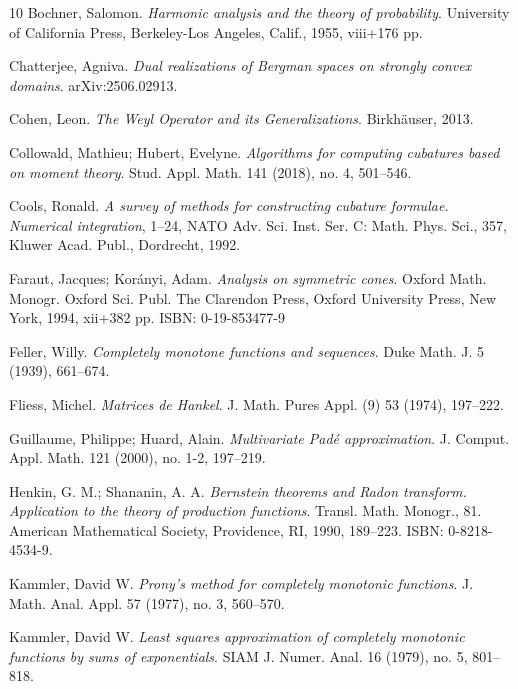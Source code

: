 \documentclass[11pt,reqno]{amsart}
\theoremstyle{plain}
\theoremstyle{definition}
\numberwithin{equation}{section}
\begin{document}
\begin{thebibliography}{10}
		 Bochner, Salomon. {\em Harmonic analysis and the theory of probability}. University of California Press, Berkeley-Los Angeles, Calif., 1955, viii+176 pp.
		
		
	


        Chatterjee, Agniva. {\em Dual realizations of Bergman spaces on strongly convex domains}. arXiv:2506.02913.

           Cohen, Leon. {\em The Weyl Operator and its Generalizations}. Birkh\"auser, 2013.

         Collowald, Mathieu; Hubert, Evelyne. {\em Algorithms for computing cubatures based on moment theory}. Stud. Appl. Math. 141 (2018), no. 4, 501–546.


 Cools, Ronald. {\em A survey of methods for constructing cubature formulae. Numerical integration}, 1--24, NATO Adv. Sci. Inst. Ser. C: Math. Phys. Sci., 357, Kluwer Acad. Publ., Dordrecht, 1992.



          Faraut, Jacques; Korányi, Adam. {\em Analysis on symmetric cones}. Oxford Math. Monogr. Oxford Sci. Publ.
The Clarendon Press, Oxford University Press, New York, 1994, xii+382 pp.
ISBN: 0-19-853477-9
		
		 Feller, Willy. {\em Completely monotone functions and sequences}.
		Duke Math. J. 5 (1939), 661–674.
		
		 Fliess, Michel. {\em Matrices de Hankel}.
		J. Math. Pures Appl. (9) 53 (1974), 197–222.
		
		
		Guillaume, Philippe; Huard, Alain. {\em Multivariate Padé approximation}.
		J. Comput. Appl. Math. 121 (2000), no. 1-2, 197–219.
		
		 Henkin, G. M.; Shananin, A. A. {\em Bernstein theorems and Radon transform. Application to the theory of production functions}.
		Transl. Math. Monogr., 81.
		American Mathematical Society, Providence, RI, 1990, 189–223.
		ISBN: 0-8218-4534-9.

       Kammler, David W. {\em Prony's method for completely monotonic functions}. J. Math. Anal. Appl. 57 (1977), no. 3, 560–570.
		
        
		 Kammler, David W. {\em Least squares approximation of completely monotonic functions by sums of exponentials}. SIAM J. Numer. Anal. 16 (1979), no. 5, 801–818. 


\end{thebibliography}
\end{document}
